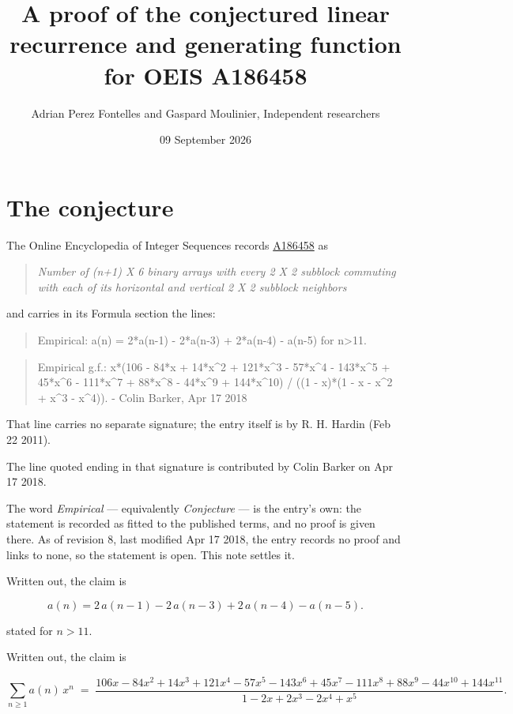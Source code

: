 \documentclass[11pt]{article}
\title{A proof of the conjectured linear recurrence and generating function for OEIS A186458}
\author{Adrian Perez Fontelles and Gaspard Moulinier, Independent researchers}
\date{09 September 2026}
\theoremstyle{definition}
\begin{document}
\maketitle
\section{The conjecture}

The Online Encyclopedia of Integer Sequences records \href{https://oeis.org/A186458}{A186458} as

\begin{quote}\itshape Number of (n+1) X 6 binary arrays with every 2 X 2 subblock commuting with each of its horizontal and vertical 2 X 2 subblock neighbors\end{quote}

and carries in its Formula section the lines:

\begin{quote}\ttfamily Empirical: a(n) = 2*a(n-1) - 2*a(n-3) + 2*a(n-4) - a(n-5) for n>11.\end{quote}

\begin{quote}\ttfamily Empirical g.f.: x*(106 - 84*x + 14*x\textasciicircum{}2 + 121*x\textasciicircum{}3 - 57*x\textasciicircum{}4 - 143*x\textasciicircum{}5 + 45*x\textasciicircum{}6 - 111*x\textasciicircum{}7 + 88*x\textasciicircum{}8 - 44*x\textasciicircum{}9 + 144*x\textasciicircum{}10) / ((1 - x)*(1 - x - x\textasciicircum{}2 + x\textasciicircum{}3 - x\textasciicircum{}4)). - Colin Barker, Apr 17 2018\end{quote}

That line carries no separate signature; the entry itself is by R. H. Hardin (Feb 22 2011).

The line quoted ending in that signature is contributed by Colin Barker on Apr 17 2018.

The word {\itshape Empirical} --- equivalently {\itshape Conjecture} --- is the entry's own: the statement is recorded as fitted to the published terms, and no proof is given there. As of revision 8, last modified Apr 17 2018, the entry records no proof and links to none, so the statement is open. This note settles it.

Written out, the claim is

\[a(n) = 2\,a(n-1) - 2\,a(n-3) + 2\,a(n-4) - a(n-5).\]

stated for $n > 11$.

Written out, the claim is

\[\sum_{n \ge 1} a(n)\,x^n \;=\; \frac{106x - 84x^{2} + 14x^{3} + 121x^{4} - 57x^{5} - 143x^{6} + 45x^{7} - 111x^{8} + 88x^{9} - 44x^{10} + 144x^{11}}{1 - 2x + 2x^{3} - 2x^{4} + x^{5}}.\]
\end{document}

